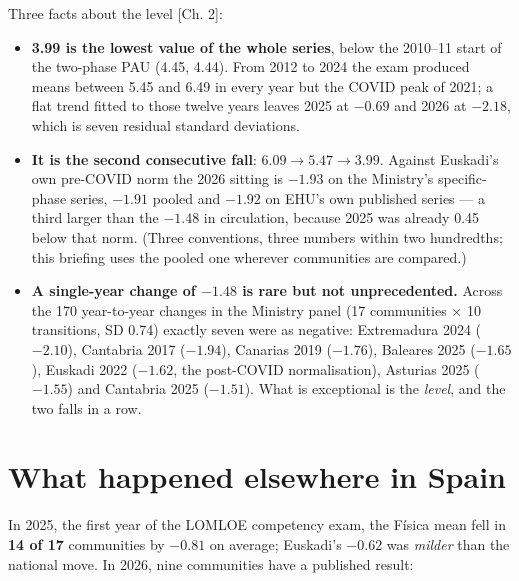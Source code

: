 \documentclass[
  10.5pt,
  a4paper,
  DIV=11,
  numbers=noendperiod]{scrartcl}
\providecommand{\tightlist}{%
  \setlength{\itemsep}{0pt}\setlength{\parskip}{0pt}}
\begin{document}
Three facts about the level {[}Ch. 2{]}:

\begin{itemize}
\tightlist
\item
  \textbf{3.99 is the lowest value of the whole series}, below the
  2010--11 start of the two-phase PAU (4.45, 4.44). From 2012 to 2024
  the exam produced means between 5.45 and 6.49 in every year but the
  COVID peak of 2021; a flat trend fitted to those twelve years leaves
  2025 at \(-0.69\) and 2026 at \(-2.18\), which is seven residual
  standard deviations.
\item
  \textbf{It is the second consecutive fall}:
  \(6.09 \to 5.47 \to 3.99\). Against Euskadi's own pre-COVID norm the
  2026 sitting is \(-1.93\) on the Ministry's specific-phase series,
  \(-1.91\) pooled and \(-1.92\) on EHU's own published series --- a
  third larger than the \(-1.48\) in circulation, because 2025 was
  already 0.45 below that norm. (Three conventions, three numbers within
  two hundredths; this briefing uses the pooled one wherever communities
  are compared.)
\item
  \textbf{A single-year change of \(-1.48\) is rare but not
  unprecedented.} Across the 170 year-to-year changes in the Ministry
  panel (17 communities × 10 transitions, SD 0.74) exactly seven were as
  negative: Extremadura 2024 (\(-2.10\)), Cantabria 2017 (\(-1.94\)),
  Canarias 2019 (\(-1.76\)), Baleares 2025 (\(-1.65\)), Euskadi 2022
  (\(-1.62\), the post-COVID normalisation), Asturias 2025 (\(-1.55\))
  and Cantabria 2025 (\(-1.51\)). What is exceptional is the
  \emph{level}, and the two falls in a row.
\end{itemize}

\section{What happened elsewhere in
Spain}\label{what-happened-elsewhere-in-spain}

In 2025, the first year of the LOMLOE competency exam, the Física mean
fell in \textbf{14 of 17} communities by \(-0.81\) on average; Euskadi's
\(-0.62\) was \emph{milder} than the national move. In 2026, nine
communities have a published result:
\end{document}
